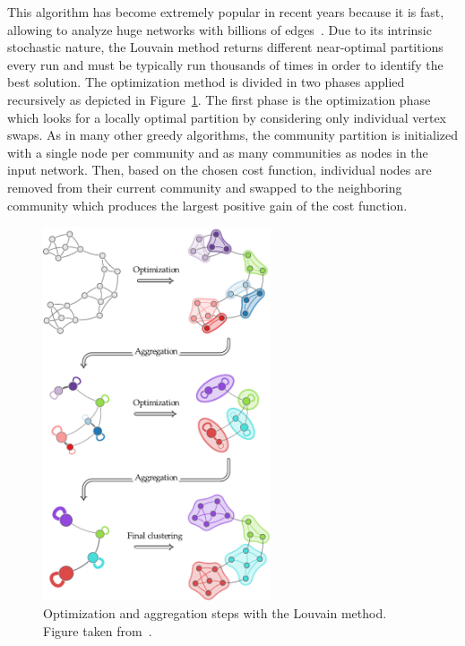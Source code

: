 This algorithm has become extremely popular in recent years because it is fast, allowing to analyze huge networks with billions of edges~\cite{lancichinetti2009}.
Due to its intrinsic stochastic nature, the Louvain method returns different near-optimal partitions every run and must be typically run thousands of times in order to identify the best solution.
The optimization method is divided in two phases applied recursively as depicted in Figure~\ref{fig:louvain_method}. The first phase is the optimization phase which looks for a locally optimal partition by considering only individual vertex swaps. As in many other greedy algorithms, the community partition is initialized with a single node per community and as many communities as nodes in the input network. Then, based on the chosen cost function, individual nodes are removed from their current community and swapped to the neighboring community which produces the largest positive gain of the cost function.

\begin{figure}[htb!]
\centering
\includegraphics[width=0.6\textwidth]{images/louvain_method.pdf}
\caption{Optimization and aggregation steps with the Louvain method. Figure taken from~\cite{browet2014}.}
\label{fig:louvain_method}
\end{figure}


